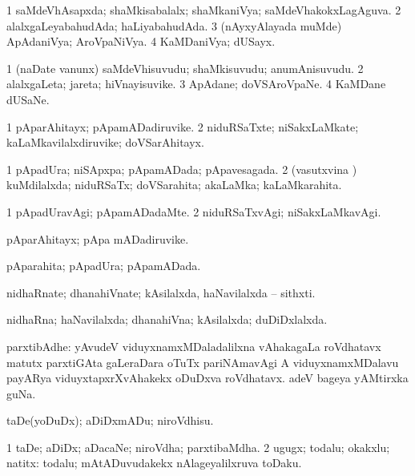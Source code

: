 \bentry
{}
\gl{\gu}
\bmng
\bnum
\num{1} saMdeVhAsapxda; shaMkisabalalx; shaMkaniVya; saMdeVhakokxLagAguva. 
\num{2} alalxgaLeyabahudAda; haLiyabahudAda. 
\num{3} (nAyxyAlayada muMde) ApAdaniVya; AroVpaNiVya. 
\num{4} KaMDaniVya; dUSayx. 
\enum
\emng
\eentry

\bentry
{}
\gl{\nA}
\bmng
\bnum
\num{1} (naDate \mo vanunx) saMdeVhisuvudu; shaMkisuvudu; anumAnisuvudu. 
\num{2} alalxgaLeta; jareta; hiVnayisuvike. 
\num{3} ApAdane; doVSAroVpaNe. 
\num{4} KaMDane dUSaNe. 
\enum
\emng
\eentry

\bentry
{}
\gl{\nA}
\bmng
\bnum
\num{1} pAparAhitayx; pApamADadiruvike. 
\num{2} niduRSaTxte; niSakxLaMkate; kaLaMkavilalxdiruvike; doVSarAhitayx. 
\enum
\emng
\eentry

\bentry
{}
\gl{\gu}
\bmng
\bnum
\num{1} pApadUra; niSApxpa; pApamADada; pApavesagada. 
\num{2} (vasutxvina \vi) kuMdilalxda; niduRSaTx; doVSarahita; akaLaMka; kaLaMkarahita. 
\enum
\emng
\eentry

\bentry
{}
\gl{\kirxvi}
\bmng
\bnum
\num{1} pApadUravAgi; pApamADadaMte. 
\num{2} niduRSaTxvAgi; niSakxLaMkavAgi. 
\enum
\emng
\eentry

\bentry
{}
\gl{\nA}
\bmng
pAparAhitayx; pApa mADadiruvike. 
\emng
\eentry

\bentry
{}
\gl{\gu}
\bmng
pAparahita; pApadUra; pApamADada. 
\emng
\eentry

\bentry
{}
\gl{\nA}
\bmng
nidhaRnate; dhanahiVnate; kAsilalxda, haNavilalxda -- sithxti. 
\emng
\eentry

\bentry
{}
\gl{\gu}
\bmng
nidhaRna; haNavilalxda; dhanahiVna; kAsilalxda; duDiDxlalxda. 
\emng
\eentry

\bentry
{}
\gl{\nA}
\bmng
parxtibAdhe: 
\banum
{} yAvudeV viduyxnamxMDaladalilxna vAhakagaLa roVdhatavx matutx parxtiGAta  gaLeraDara oTuTx pariNAmavAgi A viduyxnamxMDalavu payARya viduyxtapxrXvAhakekx oDuDxva roVdhatavx. 
 adeV bageya yAMtirxka guNa. 
\eanum
\emng
\eentry

\bentry
{}
\gl{\sakirx}
\bmng
taDe(yoDuDx); aDiDxmADu; niroVdhisu. 
\emng
\eentry

\bentry
{}
\gl{\nA}
\bmng
\bnum
\num{1} taDe; aDiDx; aDacaNe; niroVdha; parxtibaMdha. 
\num{2} ugugx; todalu; okakxlu; natitx:  todalu; mAtADuvudakekx nAlageyalilxruva toDaku. 
\enum
\emng

